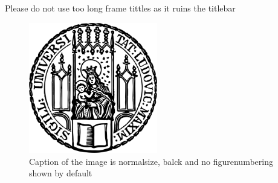 \documentclass[9pt,t]{beamer} %
\begin{document}
\begin{frame}{Please do not use too long frame tittles as it ruins the titlebar} %
  \begin{figure}[H]
    \centering
    \centerline{
    \includegraphics[width=0.5\textwidth]{logos/Sigillum_Universitatis_Ludovico-Maximilianeae.png}
    }
    \caption{Caption of the image is normalsize, balck and no figurenumbering shown by default}
  \end{figure}
\end{frame}
\end{document}
